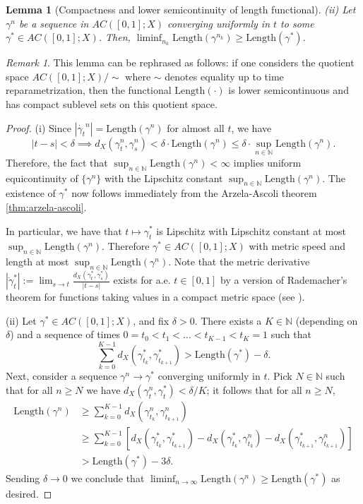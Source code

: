 \documentclass[aos, preprint]{imsart}
\theoremstyle{plain}
\newtheorem{lem}[theorem]{Lemma}
\theoremstyle{remark}
\newtheorem{rem}[example]{Remark}
\begin{document}
\begin{appendix}
\begin{lem}[Compactness and lower semicontinuity of length functional]
(ii) Let $\gamma^{n}$ be a sequence in $AC([0,1];X)$ converging
uniformly in $t$ to some $\gamma^* \in AC([0,1];X)$. Then,
$\liminf_{n_{k}}\text{Length}(\gamma^{n_{k}})\geq\text{Length}(\gamma^{*})$.
\end{lem}


\begin{rem}
  This lemma can be rephrased as follows: if one considers the
  quotient space $AC([0,1];X)/\sim$ where $\sim$ denotes equality up
  to time reparametrization, then the functional
  $\text{Length}(\cdot)$ is lower semicontinuous and has compact
  sublevel sets on this quotient space.
\end{rem}
\begin{proof}
(i)
Since
$|\dot{\gamma_{t}}^{n}|=\text{Length}(\gamma^{n})$
for almost all $t$, we have
\[
|t-s|<\delta\implies d_{X}(\gamma_{t}^{n},\gamma_{s}^{n})<\delta\cdot\text{Length}(\gamma^{n})
\le \delta  \cdot \sup_{n\in\mathbb{N}}\text{Length}(\gamma^{n}).
\]
Therefore, the fact that $\sup_{n\in\mathbb{N}}\text{Length}(\gamma^{n})<\infty$ implies uniform equicontinuity of $\{\gamma^{n}\}$ with the Lipschitz constant $\sup_{n\in\mathbb{N}}\text{Length}(\gamma^{n})$. The existence of $\gamma^*$ now follows immediately from the Arzela-Ascoli theorem  \cref{thm:arzela-ascoli}.


In particular, we have that $t\mapsto\gamma_{t}^{*}$ is Lipschitz with
Lipschitz constant at most
$\sup_{n\in\mathbb{N}}\text{Length}(\gamma^{n})$.  Therefore
$\gamma^{*} \in AC([0,1];X)$ with metric speed and length at most
$\sup_{n\in\mathbb{N}}\text{Length}(\gamma^{n})$. Note that the metric
derivative $|\dot{\gamma}_{t}^{*}|:=\lim_{s\rightarrow
  t}\frac{d_{X}(\gamma_{t}^{*},\gamma_{s}^{*})}{|t-s|}$ exists for
a.e. $t \in [0,1]$ by a version of Rademacher's theorem for functions taking values in a compact metric space (see \cite[Theorem 4.1.6]{ambrosio2004topics}).

(ii)  Let $\gamma^{*}\in AC([0,1];X)$, and fix $\delta>0$. There
exists a $K\in\mathbb{N}$ (depending on $\delta$) and a sequence
of times $0=t_{0}<t_{1}<\ldots<t_{K-1}<t_{K}=1$ such that
\[
\sum_{k=0}^{K-1}d_{X}(\gamma_{t_{k}}^{*},\gamma_{t_{k+1}}^{*})>\text{Length}(\gamma^{*})-\delta.
\]
Next, consider a sequence $\gamma^{n}\rightarrow\gamma^{*}$ converging uniformly
in $t$. Pick $N\in\mathbb{N}$ such that  for all $n \geq N$ we
  have  $d_{X}(\gamma_{t}^{n},\gamma_{t}^{*})<\delta/K$; it follows that for all $n\geq N$,
\begin{align*}
  \text{Length}(\gamma^{n}) &   \geq \sum_{k=0}^{K-1}
  d_{X}(\gamma_{t_{k}}^{n},
  \gamma_{t_{k+1}}^{n}) \\
  & \geq
  \sum_{k=0}^{K-1} \left[ d_{X}(\gamma_{t_{k}}^{*},\gamma_{t_{k+1}}^{*}) -d_{X}(\gamma_{t_{k}}^{*},\gamma_{t_{k}}^{n}) - d_{X}(\gamma_{t_{k+1}}^{*},\gamma_{t_{k+1}}^{n})\right]\\
  & >
  \text{Length}(\gamma^{*})-3\delta.
\end{align*}
Sending $\delta \rightarrow 0$ we conclude that
$\liminf_{n\rightarrow\infty} \text{Length}(\gamma^{n}) \geq
\text{Length}(\gamma^{*})$ as desired.
\end{proof}


\end{appendix}
\end{document}
